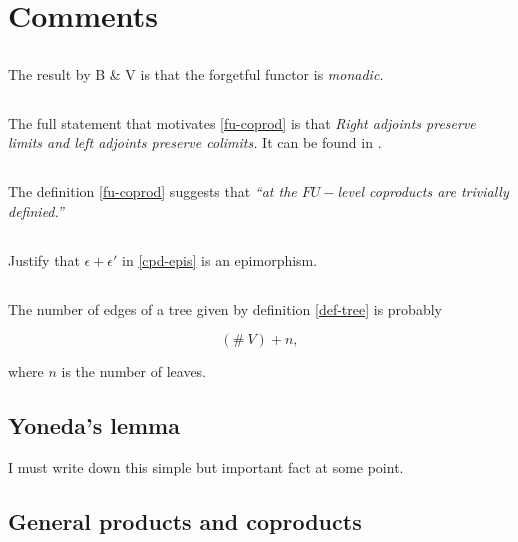 \documentclass{amsart}
\begin{document}
\section{Comments}

\subsection{} The result by B \& V is that the forgetful functor is
\emph{monadic.}

\subsection{} The full statement that motivates \eqref{fu-coprod} is that
\emph{Right adjoints preserve limits and left adjoints preserve colimits.}
It can be found in \cite{riehl-ctic}.

\subsection{} The definition \eqref{fu-coprod} suggests that
\emph{``at the $FU-$level coproducts are trivially definied.''}

\subsection{} Justify that $\epsilon + \epsilon'$ in \eqref{cpd-epis} is
an epimorphism.

\subsection{} The number of edges of a tree given by definition
\ref{def-tree} is probably

$$
(\# \ V) + n,
$$

where $n$ is the number of leaves.

\subsection{Yoneda's lemma} I must write down this simple but important
fact at some point.

\subsection{General products and coproducts}
\end{document}
